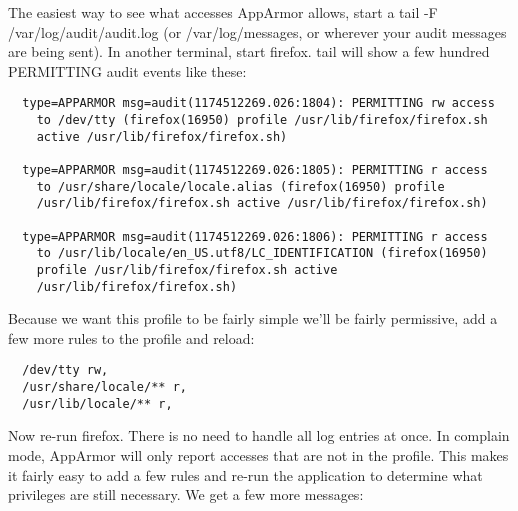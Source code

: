 \documentclass[a4paper]{article}
\renewcommand{\H}{\hspace{0pt}}
\begin{document}
The easiest way to see what accesses AppArmor allows, start a tail -F
/var/{\H}log/{\H}audit/{\H}audit.log (or /var/{\H}log/{\H}messages, or wherever your audit
messages are being sent).  In another terminal, start firefox. tail will
show a few hundred PERMITTING audit events like these:

\begin{small}
\begin{verbatim}
  type=APPARMOR msg=audit(1174512269.026:1804): PERMITTING rw access
    to /dev/tty (firefox(16950) profile /usr/lib/firefox/firefox.sh
    active /usr/lib/firefox/firefox.sh)

  type=APPARMOR msg=audit(1174512269.026:1805): PERMITTING r access
    to /usr/share/locale/locale.alias (firefox(16950) profile
    /usr/lib/firefox/firefox.sh active /usr/lib/firefox/firefox.sh)

  type=APPARMOR msg=audit(1174512269.026:1806): PERMITTING r access
    to /usr/lib/locale/en_US.utf8/LC_IDENTIFICATION (firefox(16950)
    profile /usr/lib/firefox/firefox.sh active
    /usr/lib/firefox/firefox.sh)
\end{verbatim}
\end{small}

Because we want this profile to be fairly simple we'll be fairly
permissive, add a few more rules to the profile and reload:

\begin{small}
\begin{verbatim}
  /dev/tty rw,
  /usr/share/locale/** r,
  /usr/lib/locale/** r,
\end{verbatim}
\end{small}

Now re-run firefox. There is no need to handle all log entries at once.
In complain mode, AppArmor will only report accesses that are not in the
profile. This makes it fairly easy to add a few rules and re-run the
application to determine what privileges are still necessary.  We get a
few more messages:
\end{document}
